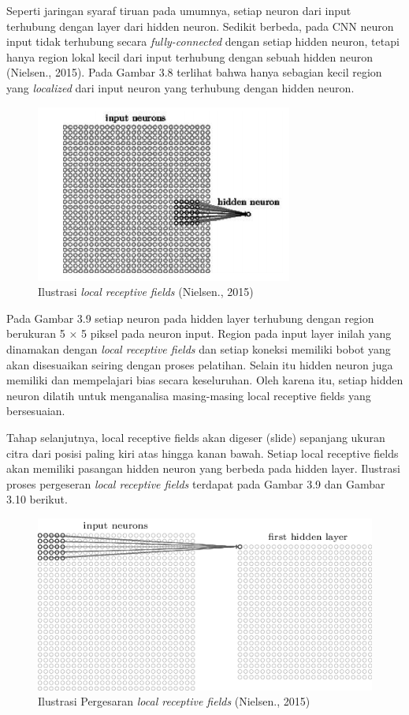 Seperti jaringan syaraf tiruan pada umumnya, setiap neuron dari input
terhubung dengan layer dari hidden neuron. Sedikit berbeda, pada CNN neuron 
input tidak terhubung secara \emph{fully-connected} dengan setiap hidden neuron, tetapi 
hanya region lokal kecil dari input terhubung dengan sebuah hidden neuron
(Nielsen., 2015). Pada Gambar 3.8 terlihat bahwa hanya sebagian kecil region
yang \emph{localized} dari input neuron yang terhubung dengan hidden neuron.
\begin{figure}[H]
	\centering
	\includegraphics[width=0.5\linewidth]{hidenneuron}
	\caption{Ilustrasi \emph{local receptive fields} (Nielsen., 2015)}
	\label{fig:hidenneuron}
\end{figure}

Pada Gambar 3.9 setiap neuron pada hidden layer terhubung dengan
region berukuran 5 × 5 piksel pada neuron input. Region pada input layer inilah
yang dinamakan dengan \emph{local receptive fields} dan setiap koneksi memiliki bobot
yang akan disesuaikan seiring dengan proses pelatihan. Selain itu hidden neuron 
juga memiliki dan mempelajari bias secara keseluruhan. Oleh karena itu, setiap
hidden neuron dilatih untuk menganalisa masing-masing local receptive fields yang 
bersesuaian.

Tahap selanjutnya, local receptive fields akan digeser (slide) sepanjang 
ukuran citra dari posisi paling kiri atas hingga kanan bawah. Setiap local receptive
fields akan memiliki pasangan hidden neuron yang berbeda pada hidden layer.
Ilustrasi proses pergeseran \emph{local receptive fields} terdapat pada Gambar 3.9 dan
Gambar 3.10 berikut.
\begin{figure}[h]
	\centering
	\includegraphics[width=0.65\linewidth]{neuron2}
	\caption{Ilustrasi Pergesaran \emph{local receptive fields} (Nielsen., 2015)}
	\label{fig:neuron2}
\end{figure}

